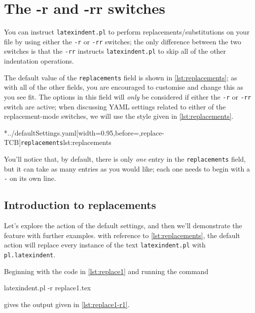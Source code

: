 \section{The -r and -rr switches}\label{sec:replacements}

You can instruct \texttt{latexindent.pl} to perform replacements/substitutions 
on your file by using either the \texttt{-r} or \texttt{-rr} switches; the only 
difference between the two switches is that the \texttt{-rr} instructs \texttt{latexindent.pl}
to skip all of the other indentation operations.

The default value of the \texttt{replacements} field is shown in \cref{lst:replacements}; 
as with all of the other fields, you are encouraged to customise and change this 
as you see fit. The options in this field will \emph{only} be considered if either the 
\texttt{-r} or \texttt{-rr} switch are active; when discussing YAML settings related to either 
of the replacement-mode switches, we will use the style given in \cref{lst:replacements}.

\cmhlistingsfromfile*[style=replacements]*{../defaultSettings.yaml}[width=0.95\linewidth,before=\centering,replace-TCB]{\texttt{replacements}}{lst:replacements}

You'll notice that, by default, there is only \emph{one} entry in the \texttt{replacements} field, but 
it can take as many entries as you would like; each one needs to begin with a \texttt{-} on its own line.

\subsection{Introduction to replacements}
Let's explore the action of the default settings, and then we'll demonstrate the feature with further examples.
with reference to \cref{lst:replacements}, the default action will replace every instance of the text \texttt{latexindent.pl}
with \texttt{pl.latexindent}. 

Beginning with the code in \cref{lst:replace1} and running the command
\begin{commandshell}
latexindent.pl -r replace1.tex
\end{commandshell}
gives the output given in \cref{lst:replace1-r1}.

        \begin{cmhtcbraster}[raster column skip=.01\linewidth]
        \end{cmhtcbraster}

